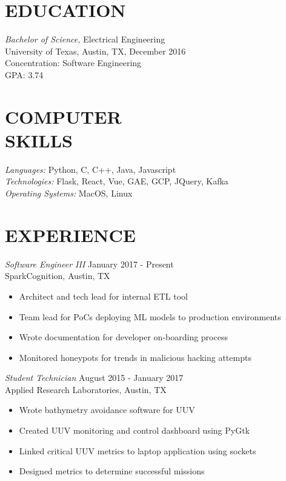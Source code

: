\documentclass[margin,10pt]{res}
\begin{document}
\address{philliplemons512@gmail.com
      \\ www.philliplemons.com}

\begin{resume}

\section{EDUCATION} {\sl Bachelor of Science,} Electrical Engineering \\
                University of Texas, Austin, TX,
                December 2016 \\
                Concentration: Software Engineering \\
                GPA: 3.74

\section{COMPUTER \\ SKILLS} {\sl Languages:} Python, C, C++, Java,
                Javascript \\
                {\sl Technologies:} Flask, React, Vue, GAE, GCP, JQuery, Kafka \\
                {\sl Operating Systems:} MacOS, Linux

\section{EXPERIENCE}
    {\sl Software Engineer III} \hfill         January 2017 - Present \\
    SparkCognition, Austin, TX
    \begin{itemize} \itemsep -2pt %
        \item Architect and tech lead for internal ETL tool
        \item Team lead for PoCs deploying ML models to production environments
        \item Wrote documentation for developer on-boarding process
        \item Monitored honeypots for trends in malicious hacking attempts
    \end{itemize}

    {\sl Student Technician} \hfill            August 2015 - January 2017 \\
    Applied Research Laboratories, Austin, TX
    \begin{itemize}  \itemsep -2pt %
        \item Wrote bathymetry avoidance software for UUV
        \item Created UUV monitoring and control dashboard using PyGtk
        \item Linked critical UUV metrics to laptop application using sockets
        \item Designed metrics to determine successful missions
    \end{itemize}


\end{resume}
\end{document}
